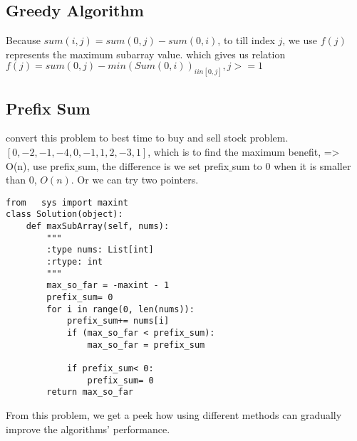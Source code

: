 \documentclass[../algorithms.tex]{subfiles}
\begin{document}
\subsection{Greedy Algorithm}
Because $sum(i,j)=sum(0,j)-sum(0,i)$, to till index $j$, we use $f(j)$ represents the maximum subarray value. which gives us relation $f(j) = sum(0,j)-min(Sum(0,i))_{i in [0,j] }, j>=1$
\subsection{Prefix Sum}
convert this problem to best time to buy and sell stock problem. $[0, -2, -1, -4, 0, -1, 1, 2, -3, 1]$, which is to find the maximum benefit, => O(n), use prefix$\_$sum, the difference is we set prefix$\_$sum to 0 when it is smaller than 0, $O(n)$. Or we can try two pointers.
\begin{lstlisting}
from   sys import maxint
class Solution(object):    
    def maxSubArray(self, nums):
        """
        :type nums: List[int]
        :rtype: int
        """
        max_so_far = -maxint - 1
        prefix_sum= 0
        for i in range(0, len(nums)):
            prefix_sum+= nums[i]
            if (max_so_far < prefix_sum):
                max_so_far = prefix_sum
 
            if prefix_sum< 0:
                prefix_sum= 0  
        return max_so_far
\end{lstlisting}
From this problem, we get a peek how using different methods can gradually improve the algorithms' performance.
\end{document}
